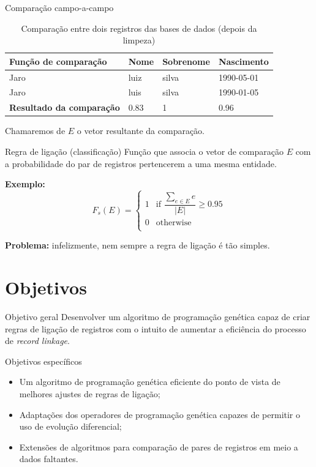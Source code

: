 \documentclass{beamer}
\begin{document}
  \begin{frame}{Comparação campo-a-campo}
      \begin{table}[]
          \centering
          \caption{Comparação entre dois registros das bases de dados (depois da limpeza)}
          \label{tbl:comparacao}
          \begin{tabular}{|l|l|l|l|}
              \hline
              Função de comparação             & Nome & Sobrenome & Nascimento \\ \hline
              Jaro                             & luiz & silva     & 1990-05-01 \\
              Jaro                             & luis & silva     & 1990-01-05 \\ \hline
              \textbf{Resultado da comparação} & 0.83 & 1         & 0.96       \\ \hline
          \end{tabular}
      \end{table}

      Chamaremos de $E$ o vetor resultante da comparação.
  \end{frame}
  \begin{frame}{Regra de ligação (classificação)}
      Função que associa o vetor de comparação $E$ com a probabilidade do par de registros pertencerem a uma mesma entidade.

      \textbf{Exemplo:} \[
          F_s(E) = \begin{cases}
              1  &  \text{if }\dfrac{\sum \limits_{e \in E} e}{|E|} \geq 0.95 \\
              0  &  \text{otherwise} \\
          \end{cases}
      \]

      \textbf{Problema:} infelizmente, nem sempre a regra de ligação é tão simples.
  \end{frame}

  \section{Objetivos}
  \begin{frame}{Objetivo geral}
      Desenvolver um algoritmo de programação genética capaz de criar regras de
      ligação de registros com o intuito de aumentar a eficiência do processo de \textit{record linkage}.
  \end{frame}
  \begin{frame}{Objetivos específicos}
      \begin{itemize}
          \item Um algoritmo de programação genética eficiente do ponto de vista de melhores ajustes de regras de ligação;
          \item Adaptações dos operadores de programação genética capazes de permitir o uso de evolução diferencial;
          \item Extensões de algoritmos para comparação de pares de registros em meio a dados faltantes.
      \end{itemize}
  \end{frame}
\end{document}
